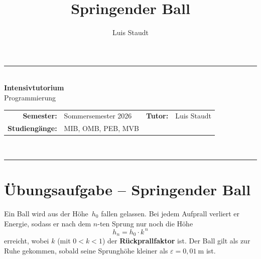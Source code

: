 \documentclass[
	fontsize=12pt,          %
	paper=a4,               %
	numbers=noenddot,       %
	listof=totoc,           %
	listof=entryprefix,     %
	listof=nochaptergap,    %
	bibliography=totoc,     %
	parskip=half            %
	openany                 %
]{scrbook}
\title{\Huge\textbf{Springender Ball}}
\author{Luis Staudt}
\date{}
\begin{document}
\begin{center}
	\rule{\textwidth}{0.8pt}\\[0.6em]
	{\LARGE\bfseries Intensivtutorium}\\[0.3em]
	{\large Programmierung}\\[0.6em]
	\begin{tabular}{r l @{\hspace{2cm}} r l}
		\textbf{Semester:}      & Sommersemester 2026                    & \textbf{Tutor:}         & Luis Staudt \\
		\textbf{Studiengänge:}  & MIB, OMB, PEB, MVB         & & \\
	\end{tabular}\\[0.6em]
	\rule{\textwidth}{0.8pt}
\end{center}
\vspace{1em}

\pagestyle{fancy}
\fancyhf{}
\cfoot{\thepage}
\renewcommand{\headrulewidth}{0.4pt}



\section*{Übungsaufgabe -- Springender Ball}

Ein Ball wird aus der Höhe~$h_0$ fallen gelassen.
Bei jedem Aufprall verliert er Energie, sodass er nach dem $n$-ten Sprung nur noch die Höhe
\[
	h_n = h_0 \cdot k^{\,n}
\]
erreicht, wobei $k$ (mit $0 < k < 1$) der \textbf{Rückprallfaktor} ist.
Der Ball gilt als \glqq zur Ruhe gekommen\grqq{}, sobald seine Sprunghöhe kleiner als $\varepsilon = 0{,}01~\text{m}$ ist.
\end{document}

